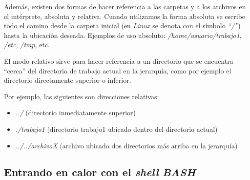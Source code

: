 \documentclass[12pt]{article}
\newcommand{\bash}{\textbf{\emph{BASH}}\ }
\begin{document}
Además, existen dos formas de hacer referencia a las carpetas y a los archivos
en el intérprete, absoluta y relativa. Cuando utilizamos la forma absoluta se
escribe todo el camino desde la carpeta inicial (en \emph{Linux} se denota con
el símbolo \emph{``/''}) hasta la ubicación deseada. Ejemplos de uso absoluto:
\emph{/home/usuario/trabajo1}, \emph{/etc}, \emph{/tmp}, etc.

El modo relativo sirve para hacer referencia a un directorio que se encuentra
``cerca'' del directorio de trabajo actual en la jerarquía, como por ejemplo
el directorio directamente superior o inferior.

Por ejemplo, las siguientes son direcciones relativas:

\vspace{-2\topsep}
\begin{itemize}

    \itemsep2pt \parskip0pt 

    \item \emph{../} (directorio inmediatamente superior)

    \item \emph{./trabajo1} (directorio trabajo1 ubicado dentro del directorio
        actual)

    \item \emph{../../archivoX} (archivo ubicado dos directorios más arriba en
        la jerarquía)

\end{itemize}

\subsection{Entrando en calor con el \emph{shell} \bash}
\end{document}
